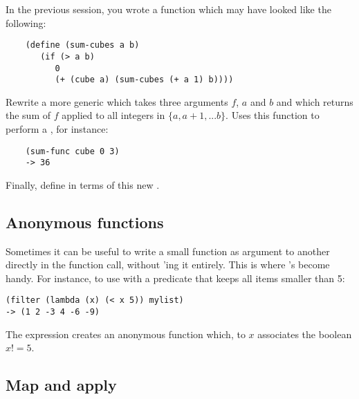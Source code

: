 \documentclass{../../../tp}
\begin{document}
\begin{instruction}
	In the previous session, you wrote a  function which may have looked like the following: 
	
	\begin{verbatim}
	(define (sum-cubes a b)
	   (if (> a b)
	      0
	      (+ (cube a) (sum-cubes (+ a 1) b))))
	\end{verbatim}
	
	Rewrite a more generic  which takes three arguments $f$, $a$ and $b$ and which returns the sum of $f$ applied to all integers in $\{a, a+1, ... b\}$. Uses this function to perform a , for instance:
	\begin{verbatim}
	(sum-func cube 0 3)
	-> 36
	\end{verbatim}
	
	Finally, define  in terms of this new .
\end{instruction}


\subsection{Anonymous functions}

Sometimes it can be useful to write a small function as argument to another directly in the function call, without 'ing it entirely. This is where 's become handy. For instance, to use  with a predicate that keeps all items smaller than 5:

\begin{verbatim}
(filter (lambda (x) (< x 5)) mylist)
-> (1 2 -3 4 -6 -9)
\end{verbatim}

The   expression creates an anonymous function which, to $x$ associates the boolean $x != 5$. 

\subsection{Map and apply}
\end{document}
